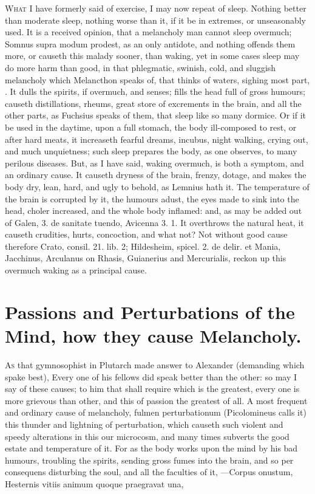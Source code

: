 {\lettrine{W}{hat} I have formerly said of exercise, I may now repeat of sleep.
Nothing better than moderate sleep, nothing worse than it, if it be in
extremes, or unseasonably used. It is a received opinion, that a
melancholy man cannot sleep overmuch; Somnus supra modum prodest, as an
only antidote, and nothing offends them more, or causeth this malady
sooner, than waking, yet in some cases sleep may do more harm than
good, in that phlegmatic, swinish, cold, and sluggish melancholy which
Melancthon speaks of, that thinks of waters, sighing most part, \etc{}.
It dulls the spirits, if overmuch, and senses; fills the head
full of gross humours; causeth distillations, rheums, great store of
excrements in the brain, and all the other parts, as Fuchsius
speaks of them, that sleep like so many dormice. Or if it be used in
the daytime, upon a full stomach, the body ill-composed to rest, or
after hard meats, it increaseth fearful dreams, incubus, night walking,
crying out, and much unquietness; such sleep prepares the body, as
one observes, to many perilous diseases. But, as I have said,
waking overmuch, is both a symptom, and an ordinary cause. It causeth
dryness of the brain, frenzy, dotage, and makes the body dry, lean,
hard, and ugly to behold, as Lemnius hath it. The temperature of
the brain is corrupted by it, the humours adust, the eyes made to sink
into the head, choler increased, and the whole body inflamed: and, as
may be added out of Galen, 3. de sanitate tuendo, Avicenna 3. 1.
It overthrows the natural heat, it causeth crudities, hurts,
concoction, and what not? Not without good cause therefore Crato,
consil. 21. lib. 2; Hildesheim, spicel. 2. de delir. et Mania,
Jacchinus, Arculanus on Rhasis, Guianerius and Mercurialis, reckon up
this overmuch waking as a principal cause.


\section{Passions and Perturbations of the Mind, how they cause Melancholy.}

\lettrine{A}{s} that gymnosophist in Plutarch made answer to Alexander
(demanding which spake best), Every one of his fellows did speak better
than the other: so may I say of these causes; to him that shall require
which is the greatest, every one is more grievous than other, and this
of passion the greatest of all. A most frequent and ordinary cause of
melancholy,  fulmen perturbationum (Picolomineus calls it) this
thunder and lightning of perturbation, which causeth such violent and
speedy alterations in this our microcosm, and many times subverts the
good estate and temperature of it. For as the body works upon the mind
by his bad humours, troubling the spirits, sending gross fumes into the
brain, and so per consequens disturbing the soul, and all the faculties
of it,
---Corpus onustum,
Hesternis vitiis animum quoque praegravat una,

}

